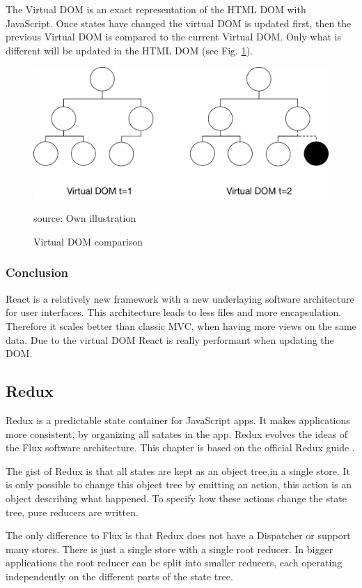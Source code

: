 The Virtual DOM is an exact representation of the HTML DOM with JavaScript. Once states have changed the virtual DOM is updated first, then the previous Virtual DOM is compared to the current Virtual DOM. Only what is different will be updated in the HTML DOM (see Fig. \ref{fig:VirtualDom}).

\begin{figure}[H]
	\centering
	\includegraphics[width=0.8\linewidth]{bilder/grundlagen/VirtualDom.png}
	\caption{Virtual DOM comparison} source: Own illustration
	\label{fig:VirtualDom}
\end{figure}


\subsubsection{Conclusion}
React is a relatively new framework with a new underlaying software architecture for user interfaces. This architecture leads to less files and more encapsulation. Therefore it scales better than classic MVC, when having more views on the same data. Due to the virtual DOM React is really performant when updating the DOM.


\subsection{Redux}
Redux is a predictable state container for JavaScript apps. It makes applications more consistent, by organizing all satates in the app. Redux evolves the ideas of the Flux software architecture. This chapter is based on the official Redux guide \cite{Redux}.
 
The gist of Redux is that all states are kept as an object tree,in a single store. It is only possible to change this object tree by emitting an action, this action is an object describing what happened. To specify how these actions change the state tree, pure reducers are written.

The only difference to Flux is that Redux does not have a Dispatcher or support many stores. There is just a single store with a single root reducer. In bigger applications the root reducer can be split into smaller reducers, each operating independently on the different parts of the state tree.

